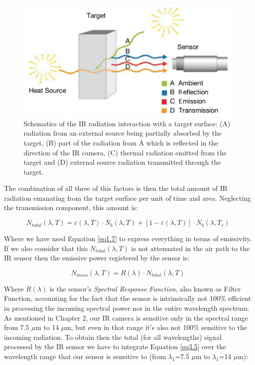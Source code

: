 		\begin{figure}[ht!]
			\centering
			\captionsetup{justification=centering,margin=2cm}
			\includegraphics[scale=0.30]{Figures/Chapter03/SchematicsOfIRRadiation.pdf}
			\caption{Schematics of the IR radiation interaction with a target surface: (A) radiation from an external source being partially absorbed by the target, (B) part of the radiation from A which is reflected in the direction of the IR camera, (C) thermal  radiation emitted from the target and (D) external source radiation transmitted through the target.}\label{fig3.1}
		\end{figure}
		
		The combination of all three of this factors is then the total amount of IR radiation emanating from the target surface per unit of time and area. Neglecting the transmission component, this amount is:
		
		\begin{equation}\label{eq3.4}
			N_{total}(\lambda,T)=\varepsilon(\lambda,T) \cdot N_{b}(\lambda,T)+ [1- \varepsilon(\lambda,T)] \cdot N_{b}(\lambda,T_{r})
		\end{equation}	
		
		Where we have used Equation \ref{eq1.7} to express everything in terms of emissivity. If we also consider that this $N_{total}(\lambda,T)$ is not attenuated in the air path to the IR sensor then the emissive power registered by the sensor is:
		
		\begin{equation}\label{eq3.5}
			N_{meas}(\lambda,T)= R(\lambda) \cdot N_{total}(\lambda,T)
		\end{equation}	
		
		Where $R(\lambda)$ is the sensor's \textit{Spectral Response Function}, also known as Filter Function, accounting for the fact that the sensor is intrinsically not 100\% efficient in processing the incoming spectral power nor in the entire wavelength spectrum. As mentioned in Chapter 2, our IR camera is sensitive only in the spectral range from 7.5 $\mu$m to 14 $\mu$m, but even in that range it's also not 100\% sensitive to the incoming radiation. 
		To obtain then the total (for all wavelengths) signal processed by the IR sensor we have to integrate Equation \ref{eq3.5} over the wavelength range that our sensor is sensitive to (from $\lambda_{1}$=7.5 $\mu$m to $\lambda_{1}$=14 $\mu$m):
		
